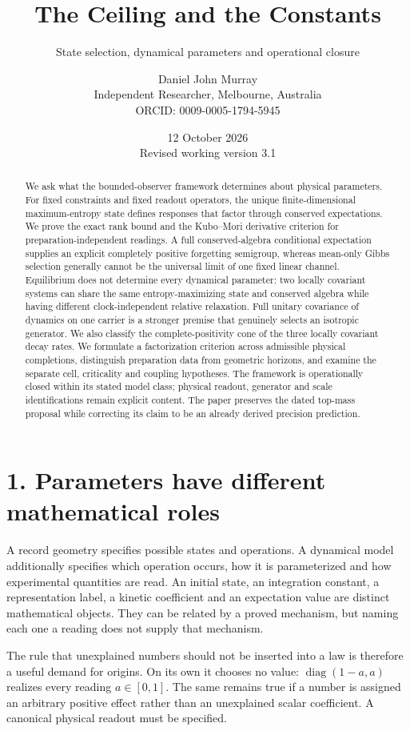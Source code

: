 \documentclass[
  11pt,
  a4paper,
]{article}
\title{The Ceiling and the Constants}
\subtitle{State selection, dynamical parameters and operational closure}
\author{Daniel John Murray\\{\small Independent Researcher, Melbourne, Australia}\\{\small ORCID: 0009-0005-1794-5945}}
\date{12 October 2026\\{\small Revised working version 3.1}}
\begin{document}
\maketitle
\begin{abstract}
We ask what the bounded-observer framework determines about physical parameters. For fixed constraints and fixed readout operators, the unique finite-dimensional maximum-entropy state defines responses that factor through conserved expectations. We prove the exact rank bound and the Kubo--Mori derivative criterion for preparation-independent readings. A full conserved-algebra conditional expectation supplies an explicit completely positive forgetting semigroup, whereas mean-only Gibbs selection generally cannot be the universal limit of one fixed linear channel. Equilibrium does not determine every dynamical parameter: two locally covariant systems can share the same entropy-maximizing state and conserved algebra while having different clock-independent relative relaxation. Full unitary covariance of dynamics on one carrier is a stronger premise that genuinely selects an isotropic generator. We also classify the complete-positivity cone of the three locally covariant decay rates. We formulate a factorization criterion across admissible physical completions, distinguish preparation data from geometric horizons, and examine the separate cell, criticality and coupling hypotheses. The framework is operationally closed within its stated model class; physical readout, generator and scale identifications remain explicit content. The paper preserves the dated top-mass proposal while correcting its claim to be an already derived precision prediction.
\end{abstract}

\section{1. Parameters have different mathematical roles}\label{parameters-have-different-mathematical-roles}

A record geometry specifies possible states and operations. A dynamical model additionally specifies which operation occurs, how it is parameterized and how experimental quantities are read. An initial state, an integration constant, a representation label, a kinetic coefficient and an expectation value are distinct mathematical objects. They can be related by a proved mechanism, but naming each one a reading does not supply that mechanism.

The rule that unexplained numbers should not be inserted into a law is therefore a useful demand for origins. On its own it chooses no value: \(\operatorname{diag}(1-a,a)\) realizes every reading \(a\in[0,1]\). The same remains true if a number is assigned an arbitrary positive effect rather than an unexplained scalar coefficient. A canonical physical readout must be specified.
\end{document}
